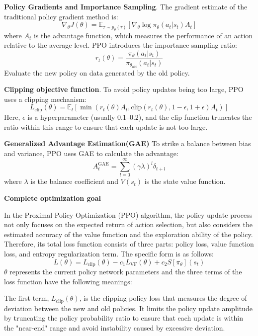 \documentclass[lettersize,journal]{IEEEtran}
\begin{document}
\textbf{Policy Gradients and Importance Sampling}.
The gradient estimate of the traditional policy gradient method is:
\begin{equation}
	\nabla_{\theta} J(\theta) = \mathbb{E}_{\tau \sim p_{\theta}(\tau)} \left[ \nabla_{\theta} \log \pi_{\theta}(a_t|s_t) A_t \right]
\end{equation}
where $A_t$ is the advantage function, which measures the performance of an action relative to the average level. 
PPO introduces the importance sampling ratio:
\begin{equation}
	r_t(\theta) = \frac{\pi_{\theta}(a_t|s_t)}{\pi_{\theta_{\text{old}}}(a_t|s_t)}
\end{equation}
Evaluate the new policy on data generated by the old policy.


\textbf{Clipping objective function}.
To avoid policy updates being too large, PPO uses a clipping mechanism:
\[
L_{\text{clip}}(\theta) = \mathbb{E}_t \left[ \min \left( r_t(\theta) A_t, \text{clip}(r_t(\theta), 1 - \epsilon, 1 + \epsilon) A_t \right) \right]
\]
Here, $\epsilon$ is a hyperparameter (usually 0.1–0.2), and the $\text{clip}$ function truncates the ratio within this range to ensure that each update is not too large.


\textbf{Generalized Advantage Estimation(GAE)}
To strike a balance between bias and variance, PPO uses GAE to calculate the advantage:
\[
A_t^{\text{GAE}} = \sum_{l=0}^{\infty} (\gamma \lambda)^l \delta_{t+l}
\]
where $\lambda$ is the balance coefficient and $V(s_t)$ is the state value function.


\textbf{Complete optimization goal}

In the Proximal Policy Optimization (PPO) algorithm, the policy update process not only focuses on the expected return of action selection, but also considers the estimated accuracy of the value function and the exploration ability of the policy. 
Therefore, its total loss function consists of three parts: policy loss, value function loss, and entropy regularization term. 
The specific form is as follows:
\begin{equation}
	L(\theta) = L_{\text{clip}}(\theta) - c_1 L_{\text{VF}}(\theta) + c_2 S[\pi_{\theta}](s_t)
\end{equation}
$\theta$ represents the current policy network parameters and the three terms of the loss function have the following meanings:

The first term, $L_{\text{clip}}(\theta)$, is the clipping policy loss that measures the degree of deviation between the new and old policies. 
It limits the policy update amplitude by truncating the policy probability ratio to ensure that each update is within the "near-end" range and avoid instability caused by excessive deviation.
\end{document}
